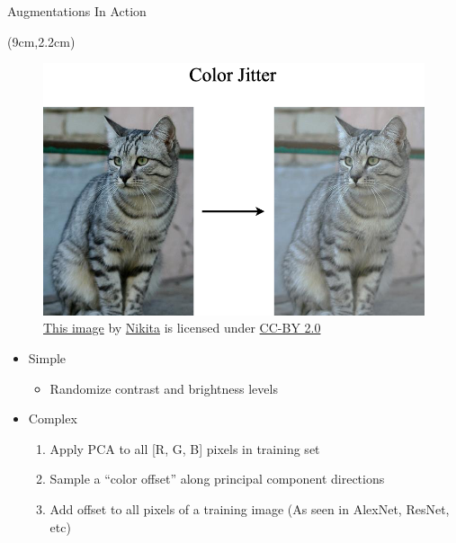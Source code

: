 \documentclass[serif, aspectratio=169]{beamer}
\begin{document}
\begin{frame}{Augmentations In Action}
	\begin{textblock*}{6cm}(9cm,2.2cm) %
		\begin{figure}
			\includegraphics[keepaspectratio, scale=0.22]{pic/jitter}
			\caption*{\tiny{\href{https://www.flickr.com/photos/malfet/1428198050}{\color{blue} This image} by \href{https://www.flickr.com/photos/malfet/}{\color{blue} Nikita} is licensed under \href{https://creativecommons.org/licenses/by/2.0/}{\color{blue} CC-BY 2.0}}}
		\end{figure}

	\end{textblock*}
	
	\begin{itemize}
		\item Simple
		\begin{itemize}
			\item Randomize contrast and brightness levels
		\end{itemize}
		\item Complex
		\begin{enumerate}
			\item Apply PCA to all [R, G, B] pixels \newline in training set
			\item Sample a “color offset” along principal \newline component directions
			\item Add offset to all pixels of a training \newline image
			\newline \small{(As seen in AlexNet, ResNet, etc)}
		\end{enumerate}
	\end{itemize}
\end{frame}
\end{document}
